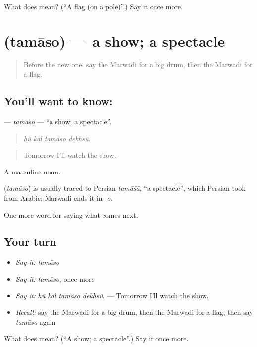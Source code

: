 \begin{tcolorbox}[breakable,colback=teal!4,colframe=teal!35!black,title={Before you move on}]
What does  mean? (\textquotedblleft{}A flag (on a pole)\textquotedblright{}.) Say it once more.
\end{tcolorbox}
\section[\texorpdfstring{\mw{तमासो} (tamāso)}{तमासो (tamāso)}]{ (tamāso) — a show; a spectacle}

\label{lesson:MW-C223-tamaso}



\begin{quote}
Before the new one: say the Marwadi for a big drum, then the Marwadi for a flag.
\end{quote}

\subsection*{You'll want to know: }
\textbf{} — \emph{tamāso} — \textquotedblleft{}a show; a spectacle\textquotedblright{}.

\begin{quote}
   
\end{quote}

\begin{quote}
\emph{hū̃ kāl tamāso dekhsū̃.}
\end{quote}

\begin{quote}
Tomorrow I'll watch the show.
\end{quote}

A masculine noun.

\begin{cousinweb}
\textbf{} (\emph{tamāso}) is usually traced to Persian \emph{tamāšā}, \textquotedblleft{}a spectacle\textquotedblright{}, which Persian took from Arabic; Marwadi ends it in \emph{-o}.
\end{cousinweb}

\begin{grammarlens}[title={What you've built}]
One more word for saying what comes next.
\end{grammarlens}

\subsection*{Your turn}
\begin{itemize}
\raggedright
  \item \emph{Say it:} \emph{tamāso}
  \item \emph{Say it:} \emph{tamāso}, once more
  \item \emph{Say it:} \emph{hū̃ kāl tamāso dekhsū̃.} — Tomorrow I'll watch the show.
  \item \emph{Recall:} say the Marwadi for a big drum, then the Marwadi for a flag, then say \emph{tamāso} again
\end{itemize}

\begin{tcolorbox}[breakable,colback=teal!4,colframe=teal!35!black,title={Before you move on}]
What does  mean? (\textquotedblleft{}A show; a spectacle\textquotedblright{}.) Say it once more.
\end{tcolorbox}
